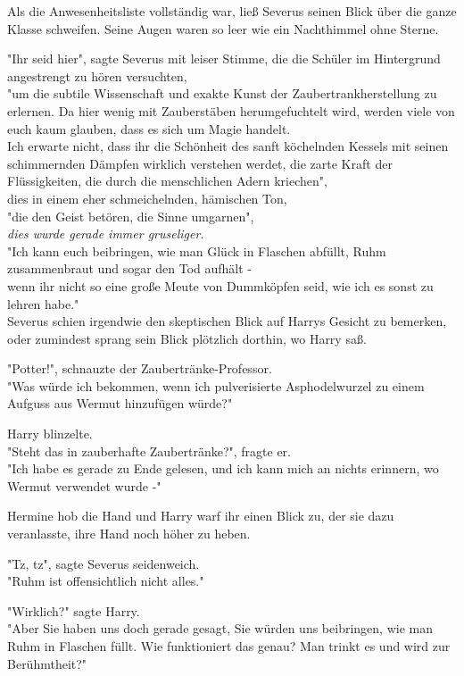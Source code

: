 {Als die Anwesenheitsliste vollständig war, ließ Severus seinen Blick über die ganze Klasse schweifen. Seine Augen waren so leer wie ein Nachthimmel ohne Sterne.

"Ihr seid hier", sagte Severus mit leiser Stimme, die die Schüler im Hintergrund angestrengt zu hören versuchten,\\ "um die subtile Wissenschaft und exakte Kunst der Zaubertrankherstellung zu erlernen. Da hier wenig mit Zauberstäben herumgefuchtelt wird, werden viele von euch kaum glauben, dass es sich um Magie handelt.\\ Ich erwarte nicht, dass ihr die Schönheit des sanft köchelnden Kessels mit seinen schimmernden Dämpfen wirklich verstehen werdet, die zarte Kraft der Flüssigkeiten, die durch die menschlichen Adern kriechen",\\ dies in einem eher schmeichelnden, hämischen Ton,\\ "die den Geist betören, die Sinne umgarnen",\\ \emph{dies wurde gerade immer gruseliger.}\\ "Ich kann euch beibringen, wie man Glück in Flaschen abfüllt, Ruhm zusammenbraut und sogar den Tod aufhält -\\ wenn ihr nicht so eine große Meute von Dummköpfen seid, wie ich es sonst zu lehren habe."\\ Severus schien irgendwie den skeptischen Blick auf Harrys Gesicht zu bemerken, oder zumindest sprang sein Blick plötzlich dorthin, wo Harry saß.

"Potter!", schnauzte der Zaubertränke-Professor.\\ "Was würde ich bekommen, wenn ich pulverisierte Asphodelwurzel zu einem Aufguss aus Wermut hinzufügen würde?"

Harry blinzelte.\\ "Steht das in zauberhafte Zaubertränke?", fragte er.\\ "Ich habe es gerade zu Ende gelesen, und ich kann mich an nichts erinnern, wo Wermut verwendet wurde -"

Hermine hob die Hand und Harry warf ihr einen Blick zu, der sie dazu veranlasste, ihre Hand noch höher zu heben.

"Tz, tz", sagte Severus seidenweich.\\ "Ruhm ist offensichtlich nicht alles."

"Wirklich?" sagte Harry.\\ "Aber Sie haben uns doch gerade gesagt, Sie würden uns beibringen, wie man Ruhm in Flaschen füllt. Wie funktioniert das genau? Man trinkt es und wird zur Berühmtheit?"

}
